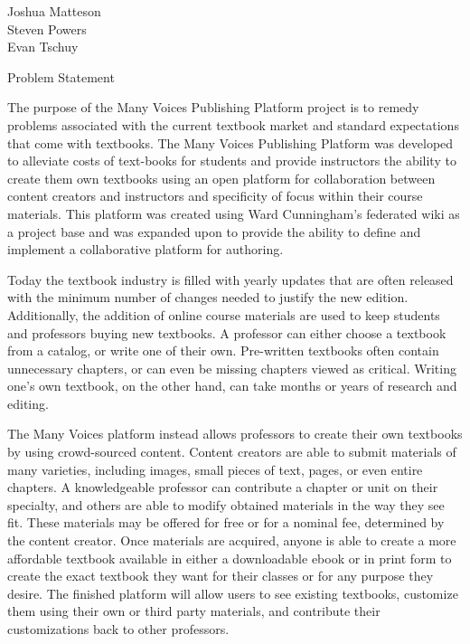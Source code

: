 \documentclass{article}
\begin{document}
    \setlength{\parindent}{0pt}
    \setlength{\parskip}{0pt}
\begingroup\flushleft
  Joshua Matteson\\
  Steven Powers\\
  Evan Tschuy
\endgroup

\setlength{\parindent}{4em}
\linespread{1.1}

\vspace{1pc}
\centerline{\sc \large Problem Statement}
\vspace{2pc}

The purpose of the Many Voices Publishing Platform project is to remedy problems 
associated with the current textbook market and standard expectations that come 
with textbooks. The Many Voices Publishing Platform was developed to alleviate 
costs of text-books for students and provide instructors the ability 
to create them own textbooks using an open platform for collaboration between 
content creators and instructors and specificity of focus within their course materials. 
This platform was created using Ward Cunningham’s federated wiki as a project 
base and was expanded upon to provide the ability to define and implement a 
collaborative platform for authoring.

Today the textbook industry is filled with yearly updates that are often released with the
minimum number of changes needed to justify the new edition. Additionally, the addition of 
online course materials are used to keep students and professors buying new textbooks. 
A professor can either choose a textbook from a catalog, or write one of their own. 
Pre-written textbooks often contain unnecessary chapters, or can even be missing chapters 
viewed as critical. Writing one's own textbook, on the other hand, can take months or 
years of research and editing.

The Many Voices platform instead allows professors to create their own textbooks 
by using crowd-sourced content. Content creators are able to submit materials of 
many varieties, including images, small pieces of text, pages, or even entire chapters. 
A knowledgeable professor can contribute a chapter or unit on their specialty, and 
others are able to modify obtained materials in the way they see fit. These materials may be
offered for free or for a nominal fee, determined by the content creator. Once materials are 
acquired, anyone is able to create a more affordable textbook available in either
a downloadable ebook or in print form to create the exact textbook they want for their classes
or for any purpose they desire. The finished platform will allow users to see existing 
textbooks, customize them using their own or third party materials, and contribute their 
customizations back to other professors.
\end{document}
